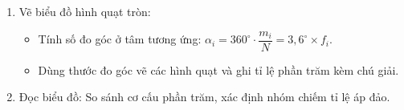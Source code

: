 \begin{enumerate}
\item Vẽ biểu đồ hình quạt tròn:
\begin{itemize}
\item Tính số đo góc ở tâm tương ứng: $\alpha_i = 360^\circ \cdot \dfrac{m_i}{N} = 3{,}6^\circ \times f_i$.
\item Dùng thước đo góc vẽ các hình quạt và ghi tỉ lệ phần trăm kèm chú giải.
\end{itemize}
\item Đọc biểu đồ: So sánh cơ cấu phần trăm, xác định nhóm chiếm tỉ lệ áp đảo.
\end{enumerate}
